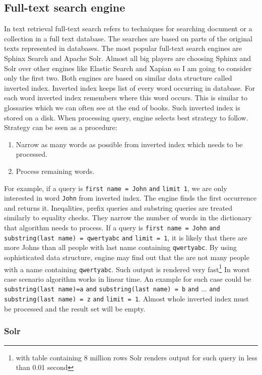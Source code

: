 \documentclass[10pt,a4paper]{article}
\begin{document}
\subsection{Full-text search engine}
In text retrieval full-text search refers to techniques for searching document or a collection in a full text database. The searches are based on parts of the original texts represented in databases. The most popular full-text search engines are Sphinx Search and Apache Solr. Almost all big players are choosing Sphinx and Solr over other engines like Elastic Search and Xapian so I am going to consider only the first two. Both engines are based on similar data structure called inverted index. Inverted index keeps list of every word occurring in database. For each word inverted index remembers where this word occurs. This is similar to glossaries which we can often see at the end of books. Such inverted index is stored on a disk. When processing query, engine selects best strategy to follow. Strategy can be seen as a procedure:
\begin{enumerate}
\item Narrow as many words as possible from inverted index which needs to be processed. 
\item Process remaining words. 
\end{enumerate}
For example, if a query is \verb|first name = John| \verb|and| \verb|limit 1|, we are only interested in word \verb|John| from inverted index. The engine finds the first occurrence and returns it. Ineqalities, prefix queries and substring queries are treated similarly to equality checks. They narrow the number of words in the dictionary that algorithm needs to process. If a query is \verb|first name = John| \verb|and| \verb|substring(last name) = qwertyabc| \verb|and| \verb|limit = 1|, it is likely that there are more Johns than all people with last name containing \verb|qwertyabc|. By using sophisticated data structure, engine may find out that the are not many people with a name containing \verb|qwertyabc|. Such output is rendered very fast\footnote{with table containing 8 million rows Solr renders output for such query in less than 0.01 second} In worst case scenario algorithm works in linear time. An example for such case could be \verb|substring(last name)=a| \verb|and| \verb|substring(last name) = b| \verb|and| ... \verb|and| \verb|substring(last name) = z| \verb|and| \verb|limit = 1|. Almost whole inverted index must be processed and the result set will be empty.

\subsubsection{Solr}
\end{document}
